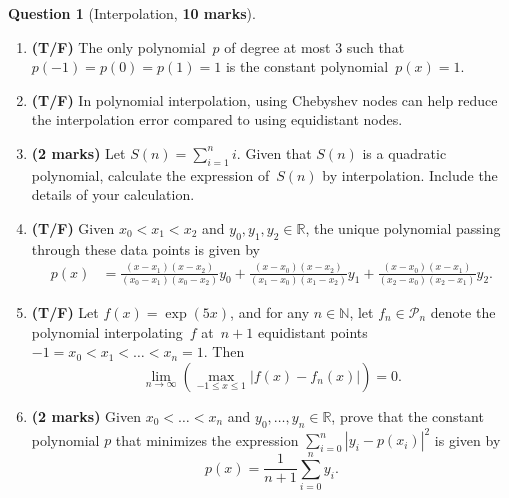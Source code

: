 \documentclass[10pt]{article}
\theoremstyle{definition}
\newtheorem{question}{Question}
\theoremstyle{remark}
\theoremstyle{plain}%
\begin{document}
\newpage
\begin{question}
    [Interpolation, \textbf{10 marks}]
    $~$
    \begin{enumerate}
        \item
            \textbf{(T/F)}
            The only polynomial~$p$ of degree at most 3 such that $p(-1) = p(0) = p(1) = 1$ is the
            constant polynomial~$p(x) = 1$.

        \item
            \textbf{(T/F)}
            In polynomial interpolation, using Chebyshev nodes can help reduce the interpolation error compared to using equidistant nodes.

        \item
            \textbf{(2 marks)}
            Let $S(n) = \sum_{i=1}^{n} i$.
            Given that $S(n)$ is a quadratic polynomial,
            calculate the expression of~$S(n)$ by interpolation.
            Include the details of your calculation.
            \vspace{2.5cm}

        \item
            \textbf{(T/F)}
            Given $x_0 < x_1 < x_2$
            and $y_0, y_1, y_2 \in \mathbb R$,
            the unique polynomial passing through these data points is given by
            \begin{align*}
                p(x) &=
                \frac{(x - x_1) (x-x_2)}{(x_0 - x_1) (x_0 - x_2)} y_0
                + \frac{(x - x_0) (x-x_2) }{(x_1 - x_0) (x_1 - x_2)} y_1
                + \frac{(x - x_0) (x-x_1)}{(x_2 - x_0) (x_2 - x_1)} y_2.
            \end{align*}

        \item
            \textbf{(T/F)}
            Let $f(x) = \exp(5x)$,
            and for any $n \in \mathbb N$,
            let $f_n \in \mathcal P_n$ denote the polynomial interpolating~$f$ at~$n+1$ equidistant points $-1 = x_0 < x_1 < \dotsc < x_n = 1$.
            Then
            \[
                \lim_{n \to \infty} \left( \max_{-1 \leqslant x \leqslant 1} \bigl\lvert f(x) - f_n(x) \bigr\rvert \right) = 0.
            \]

        \item
            \textbf{(2 marks)}
            Given $x_0 < \dotsc < x_n$
            and $y_0, \dotsc, y_n \in \mathbb R$,
            prove that the constant polynomial $p$ that minimizes
            the expression $\sum_{i=0}^{n} |y_i - p(x_i)|^2$ is given by
            \[
                p(x) = \frac{1}{n+1} \sum_{i=0}^{n} y_i.
            \]
            \vspace{1.0cm}


\end{enumerate}
\end{question}
\end{document}
